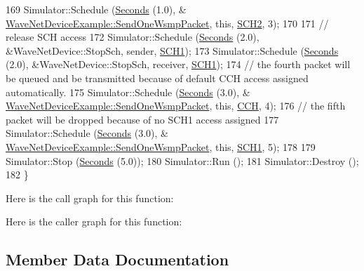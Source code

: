 \begin{DoxyCode}
169   Simulator::Schedule (\hyperlink{group__timecivil_ga33c34b816f8ff6628e33d5c8e9713b9e}{Seconds} (1.0), &
      \hyperlink{classWaveNetDeviceExample_a2dc13b30baad7f9e0a3f23d3dc60557c}{WaveNetDeviceExample::SendOneWsmpPacket},  \textcolor{keyword}{this}, 
      \hyperlink{channel-manager_8h_a07a0bff852fe2b8538a46d6e779546b6}{SCH2}, 3);
170 
171   \textcolor{comment}{// release SCH access}
172   Simulator::Schedule (\hyperlink{group__timecivil_ga33c34b816f8ff6628e33d5c8e9713b9e}{Seconds} (2.0), &WaveNetDevice::StopSch, sender, 
      \hyperlink{channel-manager_8h_a456a1b730523e5d3b8a29fb227d10028}{SCH1});
173   Simulator::Schedule (\hyperlink{group__timecivil_ga33c34b816f8ff6628e33d5c8e9713b9e}{Seconds} (2.0), &WaveNetDevice::StopSch, receiver, 
      \hyperlink{channel-manager_8h_a456a1b730523e5d3b8a29fb227d10028}{SCH1});
174   \textcolor{comment}{// the fourth packet will be queued and be transmitted because of default CCH access assigned
       automatically.}
175   Simulator::Schedule (\hyperlink{group__timecivil_ga33c34b816f8ff6628e33d5c8e9713b9e}{Seconds} (3.0), &
      \hyperlink{classWaveNetDeviceExample_a2dc13b30baad7f9e0a3f23d3dc60557c}{WaveNetDeviceExample::SendOneWsmpPacket},  \textcolor{keyword}{this}, 
      \hyperlink{channel-manager_8h_a52d2f169cde2f6abe66ecc83f0d7ad80}{CCH}, 4);
176   \textcolor{comment}{// the fifth packet will be dropped because of no SCH1 access assigned}
177   Simulator::Schedule (\hyperlink{group__timecivil_ga33c34b816f8ff6628e33d5c8e9713b9e}{Seconds} (3.0), &
      \hyperlink{classWaveNetDeviceExample_a2dc13b30baad7f9e0a3f23d3dc60557c}{WaveNetDeviceExample::SendOneWsmpPacket},  \textcolor{keyword}{this}, 
      \hyperlink{channel-manager_8h_a456a1b730523e5d3b8a29fb227d10028}{SCH1}, 5);
178 
179   Simulator::Stop (\hyperlink{group__timecivil_ga33c34b816f8ff6628e33d5c8e9713b9e}{Seconds} (5.0));
180   Simulator::Run ();
181   Simulator::Destroy ();
182 \}
\end{DoxyCode}


Here is the call graph for this function\+:




Here is the caller graph for this function\+:




\subsection{Member Data Documentation}
